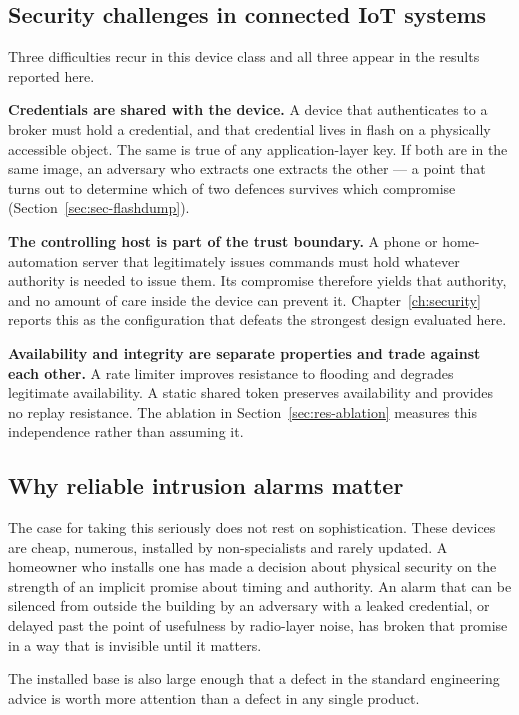 \subsection{Security challenges in connected IoT systems}

Three difficulties recur in this device class and all three appear in the results reported
here.

\textbf{Credentials are shared with the device.} A device that authenticates to a broker must
hold a credential, and that credential lives in flash on a physically accessible object. The
same is true of any application-layer key. If both are in the same image, an adversary who
extracts one extracts the other — a point that turns out to determine which of two defences
survives which compromise (Section~\ref{sec:sec-flashdump}).

\textbf{The controlling host is part of the trust boundary.} A phone or home-automation server
that legitimately issues commands must hold whatever authority is needed to issue them. Its
compromise therefore yields that authority, and no amount of care inside the device can prevent
it. Chapter~\ref{ch:security} reports this as the configuration that defeats the strongest
design evaluated here.

\textbf{Availability and integrity are separate properties and trade against each other.} A
rate limiter improves resistance to flooding and degrades legitimate availability. A static
shared token preserves availability and provides no replay resistance. The ablation in
Section~\ref{sec:res-ablation} measures this independence rather than assuming it.

\subsection{Why reliable intrusion alarms matter}

The case for taking this seriously does not rest on sophistication. These devices are cheap,
numerous, installed by non-specialists and rarely updated. A homeowner who installs one has
made a decision about physical security on the strength of an implicit promise about timing and
authority. An alarm that can be silenced from outside the building by an adversary with a
leaked credential, or delayed past the point of usefulness by radio-layer noise, has broken
that promise in a way that is invisible until it matters.

The installed base is also large enough that a defect in the standard engineering advice is
worth more attention than a defect in any single product.

